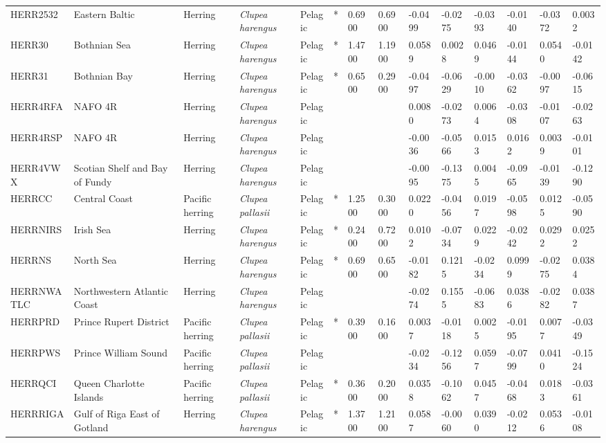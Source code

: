 \begin{longtable}{p{2.6cm}p{1.9cm}p{1.7cm}p{1.6cm}p{1cm}p{0.3cm}p{1cm}p{1cm}p{1cm}p{1.1cm}p{1cm}p{1.1cm}p{1cm}p{1.1cm}}
  HERR2532 & Eastern Baltic & Herring & \textit{Clupea harengus} & Pelagic & * & 0.6900 & 0.6900 & -0.0499 & -0.0275 & -0.0393 & -0.0140 & -0.0372 & 0.0032 \\ 
  HERR30 & Bothnian Sea & Herring & \textit{Clupea harengus} & Pelagic & * & 1.4700 & 1.1900 & 0.0589 & 0.0028 & 0.0469 & -0.0144 & 0.0540 & -0.0142 \\ 
  HERR31 & Bothnian Bay & Herring & \textit{Clupea harengus} & Pelagic & * & 0.6500 & 0.2900 & -0.0497 & -0.0629 & -0.0010 & -0.0362 & -0.0097 & -0.0615 \\ 
  HERR4RFA & NAFO 4R & Herring & \textit{Clupea harengus} & Pelagic &  &  &  & 0.0080 & -0.0273 & 0.0064 & -0.0308 & -0.0107 & -0.0263 \\ 
  HERR4RSP & NAFO 4R & Herring & \textit{Clupea harengus} & Pelagic &  &  &  & -0.0036 & -0.0566 & 0.0153 & 0.0162 & 0.0039 & -0.0101 \\ 
  HERR4VWX & Scotian Shelf and Bay of Fundy & Herring & \textit{Clupea harengus} & Pelagic &  &  &  & -0.0095 & -0.1375 & 0.0045 & -0.0965 & -0.0139 & -0.1290 \\ 
  HERRCC & Central Coast & Pacific herring & \textit{Clupea pallasii} & Pelagic & * & 1.2500 & 0.3000 & 0.0220 & -0.0456 & 0.0197 & -0.0598 & 0.0125 & -0.0590 \\ 
  HERRNIRS & Irish Sea & Herring & \textit{Clupea harengus} & Pelagic & * & 0.2400 & 0.7200 & 0.0102 & -0.0734 & 0.0229 & -0.0242 & 0.0292 & 0.0252 \\ 
  HERRNS & North Sea & Herring & \textit{Clupea harengus} & Pelagic & * & 0.6900 & 0.6500 & -0.0182 & 0.1215 & -0.0234 & 0.0999 & -0.0275 & 0.0384 \\ 
  HERRNWATLC & Northwestern Atlantic Coast & Herring & \textit{Clupea harengus} & Pelagic &  &  &  & -0.0274 & 0.1555 & -0.0683 & 0.0386 & -0.0282 & 0.0387 \\ 
  HERRPRD & Prince Rupert District & Pacific herring & \textit{Clupea pallasii} & Pelagic & * & 0.3900 & 0.1600 & 0.0037 & -0.0118 & 0.0025 & -0.0195 & 0.0077 & -0.0349 \\ 
  HERRPWS & Prince William Sound & Pacific herring & \textit{Clupea pallasii} & Pelagic &  &  &  & -0.0234 & -0.1256 & 0.0597 & -0.0799 & 0.0410 & -0.1524 \\ 
  HERRQCI & Queen Charlotte Islands & Pacific herring & \textit{Clupea pallasii} & Pelagic & * & 0.3600 & 0.2000 & 0.0358 & -0.1062 & 0.0457 & -0.0468 & 0.0183 & -0.0361 \\ 
  HERRRIGA & Gulf of Riga East of Gotland & Herring & \textit{Clupea harengus} & Pelagic & * & 1.3700 & 1.2100 & 0.0587 & -0.0060 & 0.0390 & -0.0212 & 0.0536 & -0.0108 \\ 

\end{longtable}
